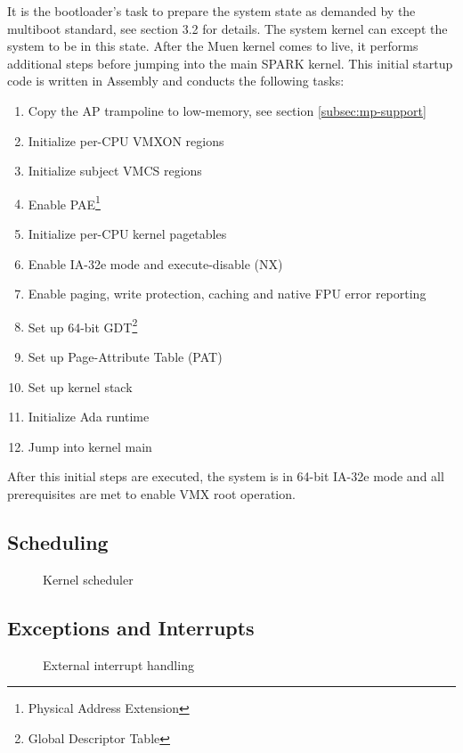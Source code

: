 It is the bootloader's task to prepare the system state as demanded by the
multiboot standard, see \cite{multiboot} section 3.2 for details. The system
kernel can except the system to be in this state. After the Muen kernel comes to
live, it performs additional steps before jumping into the main SPARK kernel.
This initial startup code is written in Assembly and conducts the following
tasks:
\begin{enumerate}
	\item Copy the AP trampoline to low-memory, see section
		\ref{subsec:mp-support} \item Initialize per-CPU VMXON regions
	\item Initialize subject VMCS regions
	\item Enable PAE\footnote{Physical Address Extension}
	\item Initialize per-CPU kernel pagetables
	\item Enable IA-32e mode and execute-disable (NX)
	\item Enable paging, write protection, caching and native FPU error
		reporting
	\item Set up 64-bit GDT\footnote{Global Descriptor Table}
	\item Set up Page-Attribute Table (PAT)
	\item Set up kernel stack
	\item Initialize Ada runtime
	\item Jump into kernel main
\end{enumerate}
After this initial steps are executed, the system is in 64-bit IA-32e mode and
all prerequisites are met to enable VMX root operation.

\subsection{Scheduling}\label{subsec:scheduling}
\begin{figure}[h]
	\centering
	
	\caption{Kernel scheduler}
	\label{fig:kernel-scheduler}
\end{figure}



\subsection{Exceptions and Interrupts}\label{subsec:excp-and-ints}
\begin{figure}[h]
	\centering
	
	\caption{External interrupt handling}
	\label{fig:external-interrupt}
\end{figure}

